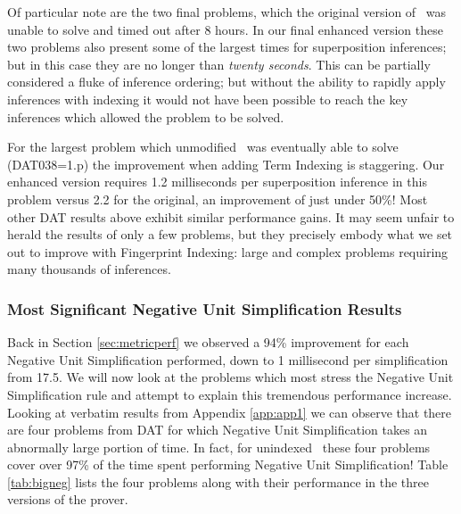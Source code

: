 
Of particular note are the two final problems, which the original version of \beagle\ 
was unable to solve and timed out after 8 hours. In our final enhanced version these two problems
also present some of the largest times for superposition inferences; but in this case
they are no longer than \emph{twenty seconds}. This can
be partially considered a fluke of inference ordering; but without the ability
to rapidly apply inferences with indexing it would not have been possible to reach
the key inferences which allowed the problem to be solved.

For the largest problem which unmodified \beagle\ was eventually able to solve (DAT038=1.p)
the improvement when adding Term Indexing is staggering. Our enhanced version
requires 1.2 milliseconds per superposition inference in this problem versus 2.2
for the original, an improvement of just under 50\%! Most other DAT results above
exhibit similar performance gains.
It may seem unfair to herald the results of only a few problems, but they precisely embody
what we set out to improve with Fingerprint Indexing: large and complex problems requiring many
thousands of inferences.


\subsubsection{Most Significant Negative Unit Simplification Results}

Back in Section \ref{sec:metricperf} we observed a 94\% improvement for each
Negative Unit Simplification performed, down to 1 millisecond per simplification from 17.5. We will
now look at the problems which most stress the Negative Unit Simplification rule
and attempt to explain this tremendous performance increase. Looking at verbatim
results from Appendix \ref{app:app1} we can observe that there are four problems
from DAT for which Negative Unit Simplification takes an abnormally large portion
of time. In fact, for unindexed \beagle\ these four problems
cover over 97\% of the time spent performing Negative Unit Simplification! Table
\ref{tab:bigneg} lists the four problems along with their performance in the
three versions of the prover.

